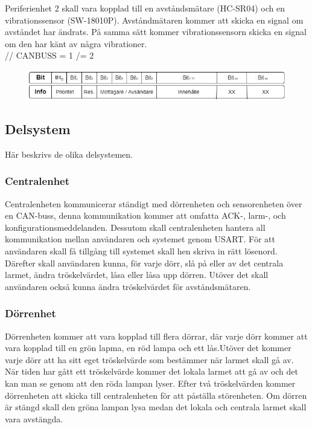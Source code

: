 \documentclass{article}
\begin{document}
Periferienhet 2 skall vara kopplad till en avståndsmätare (HC-SR04) och en vibrationssensor (SW-18010P). 
Avståndmätaren kommer att skicka en signal om avståndet har ändrats. 
På samma sätt kommer vibrationssensorn skicka en signal om den har känt av några vibrationer. \\

// CANBUSS = 1 /= 2 
\begin{figure}[h]
    \centering
    \includegraphics[scale=0.5]{Projektrapport/protokoll.png}
\end{figure}
\subsection{Delsystem}
Här beskrivs de olika delsystemen.
\subsubsection{Centralenhet}
Centralenheten kommunicerar ständigt med dörrenheten och sensorenheten över en CAN-buss, denna kommunikation kommer att omfatta ACK-, larm-, och konfigurationsmeddelanden. 
Dessutom skall centralenheten hantera all kommunikation mellan användaren och systemet genom USART. För att användaren skall få tillgång till systemet skall hen skriva in rätt lösenord. 
Därefter skall användaren kunna, för varje dörr, slå på eller av det centrala larmet, ändra tröskelvärdet, låsa eller låsa upp dörren. 
Utöver det skall användaren också kunna ändra tröskelvärdet för avståndsmätaren.



\subsubsection{Dörrenhet}

Dörrenheten kommer att vara kopplad till flera dörrar, där varje dörr kommer att vara kopplad till en grön lapma, en röd lampa och ett lås.Utöver det kommer varje dörr att ha sitt eget tröskelvärde som bestämmer när larmet skall gå av. 
När tiden har gått ett tröskelvärde kommer det lokala larmet att gå av och det kan man se genom att den röda lampan lyser. 
Efter två tröskelvärden kommer dörrenheten att skicka till centralenheten för att påställa störenheten. 
Om dörren är stängd skall den gröna lampan lysa medan det lokala och centrala larmet skall vara avstängda. 
\end{document}
